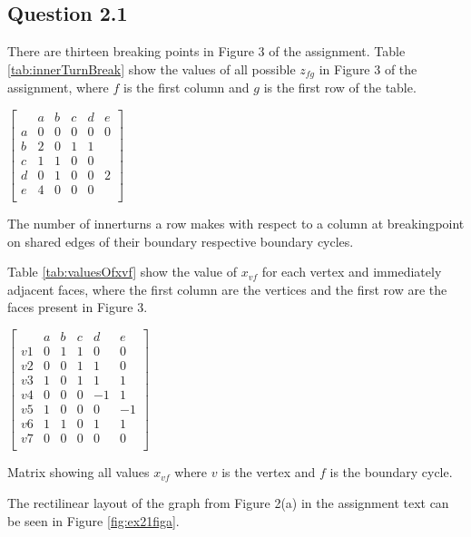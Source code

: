 \documentclass[a4paper]{article}
\begin{document}
\subsection*{Question 2.1}
There are thirteen breaking points in Figure 3 of the assignment. Table \ref{tab:innerTurnBreak} show the values of all possible \(z_{fg}\) in Figure 3 of the assignment, where \(f\) is the first column and \(g\) is the first row of the table.
\begin{table}
\centering
$
\left[
\begin{array}{cccccc}
 & a & b & c & d & e \\
a & 0 & 0 & 0 & 0 & 0 \\
b & 2 & 0 & 1 & 1 &  \\
c & 1 & 1 & 0 & 0 &  \\
d & 0 & 1 & 0 & 0 & 2 \\
e & 4 & 0 & 0 & 0 &  \\
\end{array}
\right]
$
\caption{The number of innerturns a row makes with respect to a column at breakingpoint on shared edges of their boundary respective
boundary cycles.}
\label{tab:innerTurnBreak}
\end{table}
Table \ref{tab:valuesOfxvf} show the value of \(x_{vf}\) for each vertex and immediately adjacent faces, where the first column are the vertices and the first row are the faces present in Figure 3.
\begin{table}
\centering
$
\left[
\begin{array}{cccccc}
   & a & b & c & d & e \\
v1 & 0 & 1 & 1 & 0 & 0 \\
v2 & 0 & 0 & 1 & 1 & 0 \\
v3 & 1 & 0 & 1 & 1 & 1 \\
v4 & 0 & 0 & 0 & -1 & 1\\
v5 & 1 & 0 & 0 & 0 & -1\\
v6 & 1 & 1 & 0 & 1 & 1 \\
v7 & 0 & 0 & 0 & 0 & 0 \\
\end{array}
\right]
$
\label{tab:valuesOfxvf}
\caption{Matrix showing all values $x_{vf}$ where $v$ is the vertex and $f$ is the boundary cycle.}
\end{table}
The rectilinear layout of the graph from Figure 2(a) in the assignment text can be seen in Figure \ref{fig:ex21figa}.
\end{document}

